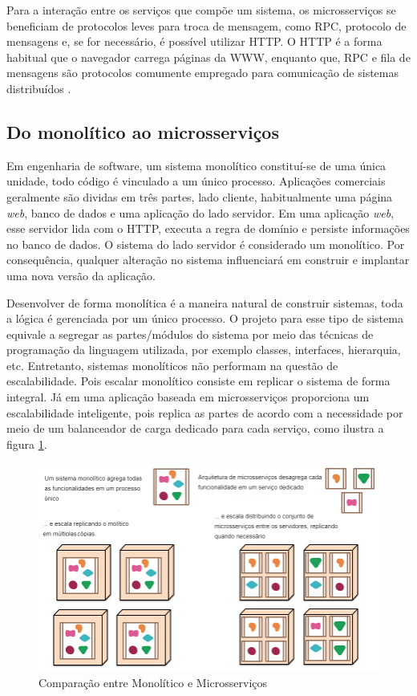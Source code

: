 Para a interação entre os serviços que compõe um sistema, os microsserviços se beneficiam de protocolos leves para troca de mensagem, como \ac{RPC}, protocolo de mensagens e, se for necessário, é possível utilizar \ac{HTTP}. O \ac{HTTP} é a forma habitual  que o navegador carrega páginas da \ac{WWW}, enquanto que, \ac{RPC} e fila de mensagens são protocolos comumente empregado para comunicação de sistemas distribuídos \cite{ericraymond2003}.

\subsection{Do monolítico ao microsserviços}
Em engenharia de software, um sistema monolítico constituí-se de uma única unidade, todo código é vinculado a um único processo. Aplicações comerciais geralmente são dividas em três partes, lado cliente, habitualmente uma página \textit{web}, banco de dados e uma aplicação do lado servidor. Em uma aplicação \textit{web}, esse servidor lida com o \ac{HTTP}, executa a regra de domínio e persiste informações no banco de dados. O sistema do lado servidor é considerado um monolítico. Por consequência, qualquer alteração no sistema influenciará em construir e implantar uma nova versão da aplicação.

Desenvolver de forma monolítica é a maneira natural de construir sistemas, toda a lógica é gerenciada por um único processo. O projeto para esse tipo de sistema equivale a segregar as partes/módulos do sistema por meio das técnicas de programação da linguagem utilizada, por exemplo classes, interfaces, hierarquia, etc. Entretanto, sistemas monolíticos não performam na questão de escalabilidade. Pois escalar monolítico consiste em replicar o sistema de forma integral. Já em uma aplicação baseada em microsserviços proporciona um escalabilidade inteligente, pois replica as partes de acordo com a necessidade por meio de um balanceador de carga dedicado para cada serviço, como ilustra a figura \ref{monolitico-microsservico}.

\begin{figure}[ht!]
    \caption{\label{monolitico-microsservico}Comparação entre Monolítico e Microsserviços}
    \centering
    \includegraphics[width=0.85\linewidth]{assets/monilitico-microsservico.png}
\end{figure}

